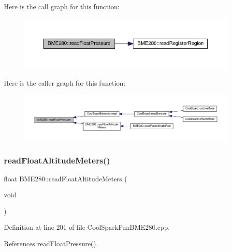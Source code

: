 Here is the call graph for this function\+:\nopagebreak
\begin{figure}[H]
\begin{center}
\leavevmode
\includegraphics[width=350pt]{df/dcf/class_b_m_e280_ada6e799917afb4f228e6253bc56ffe75_cgraph}
\end{center}
\end{figure}
Here is the caller graph for this function\+:\nopagebreak
\begin{figure}[H]
\begin{center}
\leavevmode
\includegraphics[width=350pt]{df/dcf/class_b_m_e280_ada6e799917afb4f228e6253bc56ffe75_icgraph}
\end{center}
\end{figure}
\mbox{\label{class_b_m_e280_af67b56ba50760ee1d116acc6c5010221}} 
\subsubsection{\texorpdfstring{read\+Float\+Altitude\+Meters()}{readFloatAltitudeMeters()}}
{\footnotesize\ttfamily float B\+M\+E280\+::read\+Float\+Altitude\+Meters (\begin{DoxyParamCaption}\item[{void}]{ }\end{DoxyParamCaption})}



Definition at line 201 of file Cool\+Spark\+Fun\+B\+M\+E280.\+cpp.



References read\+Float\+Pressure().



